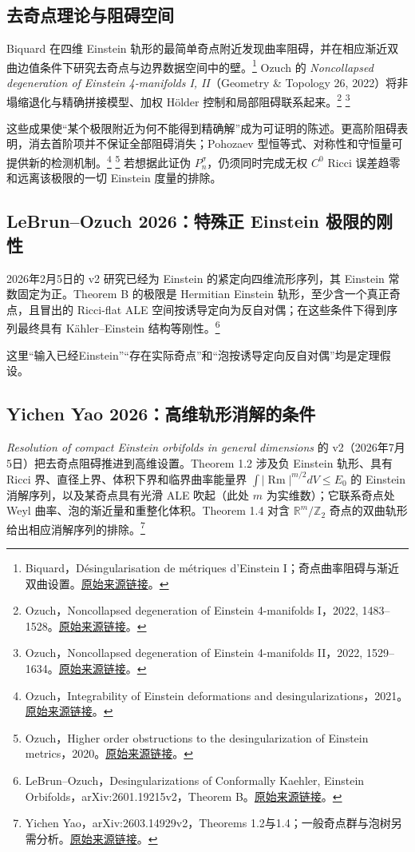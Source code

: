 \documentclass[11pt,a4paper]{article}
\theoremstyle{definition}
\newcommand{\Rm}{\operatorname{Rm}}
\newcommand{\src}[3]{\footnote{\raggedright #1，#2。\href{#3}{原始来源链接}。}}
\begin{document}
\subsection{去奇点理论与阻碍空间}

Biquard 在四维 Einstein 轨形的最简单奇点附近发现曲率阻碍，并在相应渐近双曲边值条件下研究去奇点与边界数据空间中的壁。\src{Biquard}{Désingularisation de métriques d'Einstein I；奇点曲率阻碍与渐近双曲设置}{https://arxiv.org/abs/1105.4904}
Ozuch 的 \emph{Noncollapsed degeneration of Einstein 4-manifolds I, II}（Geometry \& Topology 26, 2022）将非塌缩退化与精确拼接模型、加权 Hölder 控制和局部阻碍联系起来。\src{Ozuch}{Noncollapsed degeneration of Einstein 4-manifolds I，2022, 1483--1528}{https://doi.org/10.2140/gt.2022.26.1483}
\src{Ozuch}{Noncollapsed degeneration of Einstein 4-manifolds II，2022, 1529--1634}{https://doi.org/10.2140/gt.2022.26.1529}

这些成果使“某个极限附近为何不能得到精确解”成为可证明的陈述。更高阶阻碍表明，消去首阶项并不保证全部阻碍消失；Pohozaev 型恒等式、对称性和守恒量可提供新的检测机制。\src{Ozuch}{Integrability of Einstein deformations and desingularizations，2021}{https://arxiv.org/abs/2105.13193}
\src{Ozuch}{Higher order obstructions to the desingularization of Einstein metrics，2020}{https://arxiv.org/abs/2012.13316}
若想据此证伪 $P_n^\sigma$，仍须同时完成无权 $C^0$ Ricci 误差趋零和远离该极限的一切 Einstein 度量的排除。

\subsection{LeBrun--Ozuch 2026：特殊正 Einstein 极限的刚性}

2026年2月5日的 v2 研究已经为 Einstein 的紧定向四维流形序列，其 Einstein 常数固定为正。Theorem B 的极限是 Hermitian Einstein 轨形，至少含一个真正奇点，且冒出的 Ricci-flat ALE 空间按诱导定向为反自对偶；在这些条件下得到序列最终具有 Kähler--Einstein 结构等刚性。\src{LeBrun--Ozuch}{Desingularizations of Conformally Kaehler, Einstein Orbifolds，arXiv:2601.19215v2，Theorem B}{https://arxiv.org/html/2601.19215v2}

这里“输入已经Einstein”“存在实际奇点”和“泡按诱导定向反自对偶”均是定理假设。

\subsection{Yichen Yao 2026：高维轨形消解的条件}

\emph{Resolution of compact Einstein orbifolds in general dimensions} 的 v2（2026年7月5日）把去奇点阻碍推进到高维设置。Theorem 1.2 涉及负 Einstein 轨形、具有 Ricci 界、直径上界、体积下界和临界曲率能量界 $\int|\Rm|^{m/2}dV\le E_0$ 的 Einstein 消解序列，以及某奇点具有光滑 ALE 吹起（此处 $m$ 为实维数）；它联系奇点处 Weyl 曲率、泡的渐近量和重整化体积。Theorem 1.4 对含 $\mathbb R^m/\mathbb Z_2$ 奇点的双曲轨形给出相应消解序列的排除。\src{Yichen Yao}{arXiv:2603.14929v2，Theorems 1.2与1.4；一般奇点群与泡树另需分析}{https://arxiv.org/html/2603.14929v2}
\end{document}
